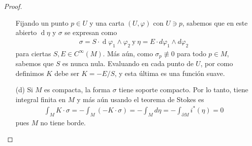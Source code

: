 \documentclass[11pt]{article}
\renewcommand{\d}{\operatorname{d}}
\begin{document}
\begin{proof}
\begin{itemize}[listparindent = \parindent]
Fijando un punto $p \in U$ y una carta $(U, \varphi)$ con $U \ni p$, sabemos que en este abierto $\d\eta$ y $\sigma$ se expresan como
\begin{align*}
\sigma = S \cdot \d\varphi_1 \wedge \varphi_2 \ \text{y} \ \eta = E \cdot d\varphi_1 \wedge d\varphi_2
\end{align*}
para ciertas $S,E \in C^\infty(M)$. Más aún, como $\sigma_p \not \equiv 0$ para todo $p \in M$, sabemos que $S$ es nunca nula. Evaluando en cada punto de $U$, por como definimos $K$ debe ser $K = -E/S$, y esta última es una función suave.
\item[(d)] Si $M$ es compacta, la forma $\sigma$ tiene soporte compacto. Por lo tanto, tiene integral finita en $M$ y más aún usando el teorema de Stokes es
\begin{align*}
\int_M K \cdot \sigma = -\int_M (-K \cdot \sigma) = -\int_M d\eta = -\int_{\partial M}i^*(\eta) = 0
\end{align*}
pues $M$ no tiene borde.
\end{itemize}
\end{proof}
\end{document}
